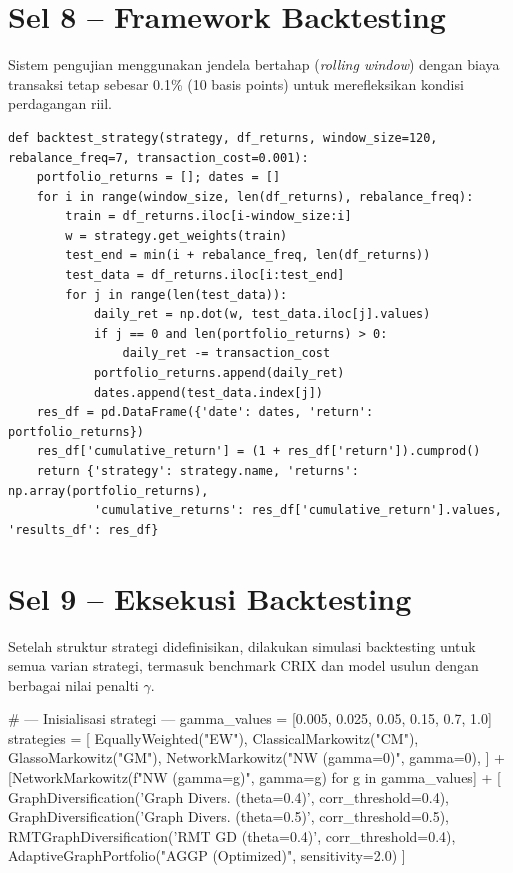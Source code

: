 \documentclass[12pt,a4paper]{article}
\begin{document}
\section{Sel 8 -- Framework Backtesting}
Sistem pengujian menggunakan jendela bertahap (\textit{rolling window}) dengan biaya transaksi tetap sebesar 0.1\% (10 basis points) untuk merefleksikan kondisi perdagangan riil.

\begin{lstlisting}[caption={Fungsi simulasi backtest}]
def backtest_strategy(strategy, df_returns, window_size=120, rebalance_freq=7, transaction_cost=0.001):
    portfolio_returns = []; dates = []
    for i in range(window_size, len(df_returns), rebalance_freq):
        train = df_returns.iloc[i-window_size:i]
        w = strategy.get_weights(train)
        test_end = min(i + rebalance_freq, len(df_returns))
        test_data = df_returns.iloc[i:test_end]
        for j in range(len(test_data)):
            daily_ret = np.dot(w, test_data.iloc[j].values)
            if j == 0 and len(portfolio_returns) > 0:
                daily_ret -= transaction_cost
            portfolio_returns.append(daily_ret)
            dates.append(test_data.index[j])
    res_df = pd.DataFrame({'date': dates, 'return': portfolio_returns})
    res_df['cumulative_return'] = (1 + res_df['return']).cumprod()
    return {'strategy': strategy.name, 'returns': np.array(portfolio_returns),
            'cumulative_returns': res_df['cumulative_return'].values, 'results_df': res_df}
\end{lstlisting}

\section{Sel 9 -- Eksekusi Backtesting}
Setelah struktur strategi didefinisikan, dilakukan simulasi backtesting untuk semua varian strategi, termasuk benchmark CRIX dan model usulun dengan berbagai nilai penalti $\gamma$.

# --- Inisialisasi strategi ---
gamma_values = [0.005, 0.025, 0.05, 0.15, 0.7, 1.0]
strategies = [
    EquallyWeighted("EW"), ClassicalMarkowitz("CM"),
    GlassoMarkowitz("GM"), NetworkMarkowitz("NW (gamma=0)", gamma=0),
] + [NetworkMarkowitz(f"NW (gamma={g})", gamma=g) for g in gamma_values] + [
    GraphDiversification('Graph Divers. (theta=0.4)', corr_threshold=0.4),
    GraphDiversification('Graph Divers. (theta=0.5)', corr_threshold=0.5),
    RMTGraphDiversification('RMT GD (theta=0.4)',   corr_threshold=0.4),
    AdaptiveGraphPortfolio("AGGP (Optimized)", sensitivity=2.0)
]
\end{document}
